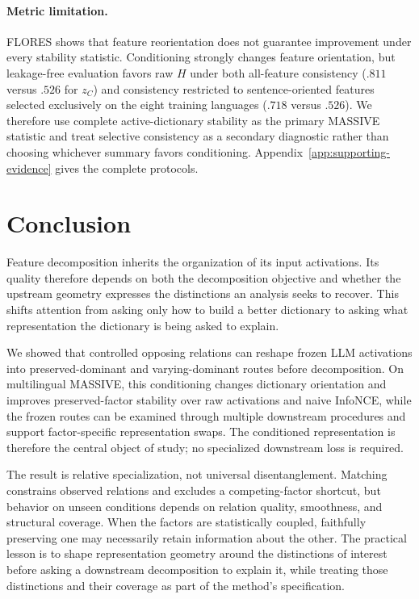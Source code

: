\documentclass[11pt]{article}
\begin{document}
\paragraph{Metric limitation.} FLORES shows that feature reorientation does not guarantee improvement under every stability statistic. Conditioning strongly changes feature orientation, but leakage-free evaluation favors raw $H$ under both all-feature consistency ($.811$ versus $.526$ for $z_C$) and consistency restricted to sentence-oriented features selected exclusively on the eight training languages ($.718$ versus $.526$). We therefore use complete active-dictionary stability as the primary MASSIVE statistic and treat selective consistency as a secondary diagnostic rather than choosing whichever summary favors conditioning. Appendix~\ref{app:supporting-evidence} gives the complete protocols.

\FloatBarrier

\section{Conclusion}
Feature decomposition inherits the organization of its input activations. Its quality therefore depends on both the decomposition objective and whether the upstream geometry expresses the distinctions an analysis seeks to recover. This shifts attention from asking only how to build a better dictionary to asking what representation the dictionary is being asked to explain.

We showed that controlled opposing relations can reshape frozen LLM activations into preserved-dominant and varying-dominant routes before decomposition. On multilingual MASSIVE, this conditioning changes dictionary orientation and improves preserved-factor stability over raw activations and naive InfoNCE, while the frozen routes can be examined through multiple downstream procedures and support factor-specific representation swaps. The conditioned representation is therefore the central object of study; no specialized downstream loss is required.

The result is relative specialization, not universal disentanglement. Matching constrains observed relations and excludes a competing-factor shortcut, but behavior on unseen conditions depends on relation quality, smoothness, and structural coverage. When the factors are statistically coupled, faithfully preserving one may necessarily retain information about the other. The practical lesson is to shape representation geometry around the distinctions of interest before asking a downstream decomposition to explain it, while treating those distinctions and their coverage as part of the method's specification.
\end{document}
